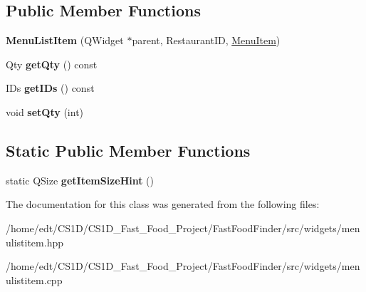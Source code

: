 \subsection*{Public Member Functions}
\begin{DoxyCompactItemize}
\item 
\hypertarget{classMenuListItem_ac1bc2b6ef02b702d540b6afab14a00b1}{{\bfseries Menu\-List\-Item} (Q\-Widget $\ast$parent, Restaurant\-I\-D, \hyperlink{classMenuItem}{Menu\-Item})}\label{classMenuListItem_ac1bc2b6ef02b702d540b6afab14a00b1}

\item 
\hypertarget{classMenuListItem_a496e21bd4dcc0587a336f5a7afc7d4e1}{Qty {\bfseries get\-Qty} () const }\label{classMenuListItem_a496e21bd4dcc0587a336f5a7afc7d4e1}

\item 
\hypertarget{classMenuListItem_a90a0f8ba010149505c27e2573612e1b3}{I\-Ds {\bfseries get\-I\-Ds} () const }\label{classMenuListItem_a90a0f8ba010149505c27e2573612e1b3}

\item 
\hypertarget{classMenuListItem_a57215af3b031d16d4a7d336c87119bae}{void {\bfseries set\-Qty} (int)}\label{classMenuListItem_a57215af3b031d16d4a7d336c87119bae}

\end{DoxyCompactItemize}
\subsection*{Static Public Member Functions}
\begin{DoxyCompactItemize}
\item 
\hypertarget{classMenuListItem_a80a341261916a5c476ff773ad260e326}{static Q\-Size {\bfseries get\-Item\-Size\-Hint} ()}\label{classMenuListItem_a80a341261916a5c476ff773ad260e326}

\end{DoxyCompactItemize}


The documentation for this class was generated from the following files\-:\begin{DoxyCompactItemize}
\item 
/home/edt/\-C\-S1\-D/\-C\-S1\-D\-\_\-\-Fast\-\_\-\-Food\-\_\-\-Project/\-Fast\-Food\-Finder/src/widgets/menulistitem.\-hpp\item 
/home/edt/\-C\-S1\-D/\-C\-S1\-D\-\_\-\-Fast\-\_\-\-Food\-\_\-\-Project/\-Fast\-Food\-Finder/src/widgets/menulistitem.\-cpp\end{DoxyCompactItemize}
